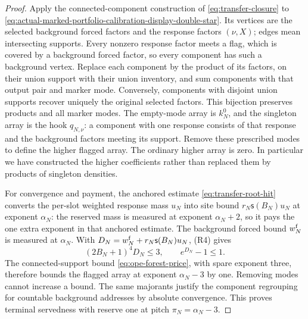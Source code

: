 \begin{proof}
Apply the connected-component construction of
\eqref{eq:transfer-closure} to \eqref{eq:actual-marked-portfolio-calibration-display-double-star}. Its vertices are the selected
background forced factors and the response factors $(\nu,X)$; edges
mean intersecting supports. Every nonzero response factor meets a flag,
which is covered by a background forced factor, so every component has
such a background vertex. Replace each component by the product of its
factors, on their union support with their union inventory, and sum
components with that output pair and marker mode. Conversely, components
with disjoint union supports recover uniquely the original selected
factors. This bijection preserves products and all marker modes. The
empty-mode array is $k_N^0$, and the singleton array is the hook
$q_{N,\nu}$: a component with one response consists of that response
and the background factors meeting its support. Remove these prescribed
modes to define the higher flagged array. The ordinary higher array is
zero. In particular we have constructed the higher coefficients rather
than replaced them by products of singleton densities.

For convergence and payment, the anchored estimate
\eqref{eq:transfer-root-hit} converts the per-slot weighted response
mass $u_N$ into site bound $r_N\mathsf s(B_N)u_N$ at exponent
$\alpha_N$: the reserved mass is measured at exponent $\alpha_N+2$,
so it pays the one extra exponent in that anchored estimate. The
background forced bound $w_N^{\rm f}$ is measured at $\alpha_N$. With
$D_N=w_N^{\rm f}+r_N\mathsf s(B_N)u_N$, (R4) gives
\[
 (2B_N+1)^4D_N\le3,\qquad e^{D_N}-1\le1.
\]
The connected-support bound \eqref{eq:ope-forest-price}, with spare
exponent three, therefore bounds the flagged array at exponent
$\alpha_N-3$ by one. Removing modes cannot increase a bound. The same
majorants justify the component regrouping for countable background
addresses by absolute convergence. This proves terminal servedness with
reserve one at pitch $\pi_N=\alpha_N-3$.


\end{proof}
